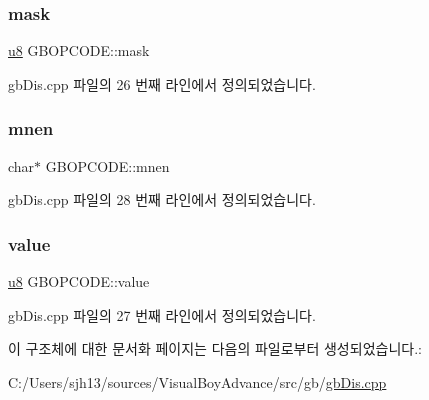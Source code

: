 \subsubsection{\texorpdfstring{mask}{mask}}
{\footnotesize\ttfamily \mbox{\hyperlink{_system_8h_aed742c436da53c1080638ce6ef7d13de}{u8}} G\+B\+O\+P\+C\+O\+D\+E\+::mask}



gb\+Dis.\+cpp 파일의 26 번째 라인에서 정의되었습니다.

\mbox{\label{struct_g_b_o_p_c_o_d_e_ac9518919dba6fed9895f2e41fb61b6ca}} 
\subsubsection{\texorpdfstring{mnen}{mnen}}
{\footnotesize\ttfamily char$\ast$ G\+B\+O\+P\+C\+O\+D\+E\+::mnen}



gb\+Dis.\+cpp 파일의 28 번째 라인에서 정의되었습니다.

\mbox{\label{struct_g_b_o_p_c_o_d_e_a7a595245e5b9550b3ad680a89e5f010d}} 
\subsubsection{\texorpdfstring{value}{value}}
{\footnotesize\ttfamily \mbox{\hyperlink{_system_8h_aed742c436da53c1080638ce6ef7d13de}{u8}} G\+B\+O\+P\+C\+O\+D\+E\+::value}



gb\+Dis.\+cpp 파일의 27 번째 라인에서 정의되었습니다.



이 구조체에 대한 문서화 페이지는 다음의 파일로부터 생성되었습니다.\+:\begin{DoxyCompactItemize}
\item 
C\+:/\+Users/sjh13/sources/\+Visual\+Boy\+Advance/src/gb/\mbox{\hyperlink{gb_dis_8cpp}{gb\+Dis.\+cpp}}\end{DoxyCompactItemize}
